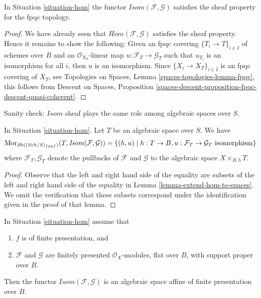 \begin{lemma}
\label{lemma-isom-sheaf}
In Situation \ref{situation-hom} the functor
$\mathit{Isom}(\mathcal{F}, \mathcal{G})$ 
satisfies the sheaf property for the fpqc topology.
\end{lemma}

\begin{proof}
We have already seen that $\mathit{Hom}(\mathcal{F}, \mathcal{G})$
satisfies the sheaf property. Hence it remains to show the following:
Given an fpqc covering $\{T_i \to T\}_{i \in I}$ of schemes over $B$
and an $\mathcal{O}_{X_T}$-linear map
$u : \mathcal{F}_T \to \mathcal{G}_T$ such that
$u_{T_i}$ is an isomorphism for all $i$, then $u$ is an isomorphism.
Since $\{X_i \to X_T\}_{i \in I}$ is an fpqc covering of $X_T$, see
Topologies on Spaces, Lemma \ref{spaces-topologies-lemma-fpqc},
this follows from
Descent on Spaces, Proposition
\ref{spaces-descent-proposition-fpqc-descent-quasi-coherent}.
\end{proof}

\noindent
Sanity check: $\mathit{Isom}$ sheaf plays the same role among algebraic spaces
over $S$.

\begin{lemma}
\label{lemma-extend-isom-to-spaces}
In Situation \ref{situation-hom}. Let $T$ be an algebraic space over $S$.
We have
$$
\mathop{\mathrm{Mor}}\nolimits_{\mathop{\mathit{Sh}}\nolimits((\mathit{Sch}/S)_{fppf})}(T, \mathit{Isom}(\mathcal{F}, \mathcal{G})) =
\{(h, u) \mid
h : T \to B, u : \mathcal{F}_T \to \mathcal{G}_T\text{ isomorphism}\}
$$
where $\mathcal{F}_T, \mathcal{G}_T$ denote the pullbacks of $\mathcal{F}$
and $\mathcal{G}$ to the algebraic space $X \times_{B, h} T$.
\end{lemma}

\begin{proof}
Observe that the left and right hand side of the equality are
subsets of the left and right hand side of the equality in
Lemma \ref{lemma-extend-hom-to-spaces}.
We omit the verification that these subsets correspond under
the identification given in the proof of that lemma.
\end{proof}

\begin{proposition}
\label{proposition-isom}
In Situation \ref{situation-hom} assume that
\begin{enumerate}
\item $f$ is of finite presentation, and
\item $\mathcal{F}$ and $\mathcal{G}$ are finitely presented
$\mathcal{O}_X$-modules, flat over $B$, with support proper over $B$.
\end{enumerate}
Then the functor $\mathit{Isom}(\mathcal{F}, \mathcal{G})$ is
an algebraic space affine of finite presentation over $B$.
\end{proposition}

